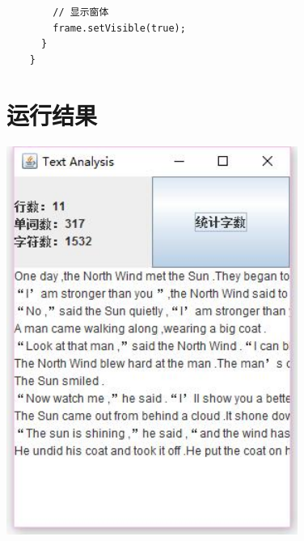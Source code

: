 \documentclass[11pt, a4paper]{article}
\begin{document}
\begin{CJK*}{UTF8}{gbsn}
\begin{lstlisting}
        // 显示窗体
        frame.setVisible(true);
      }
    }

  \end{lstlisting}

  \section{运行结果}
  \begin{center}
    \includegraphics[height=5in]{result.jpg}
  \end{center}
  
  \newpage

\end{CJK*}
\end{document}
